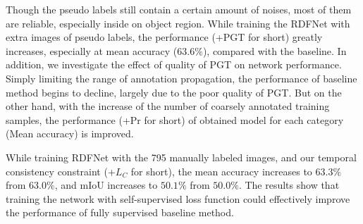 Though the pseudo labels still contain a certain amount of noises, most of them are reliable, especially inside on object region. 
%
While training the RDFNet with extra images of pseudo labels, the performance (+PGT for short) greatly increases, especially at mean accuracy ($63.6\%$), compared with the baseline.
%
In addition, we investigate the effect of quality of PGT on network performance.
%
Simply limiting the range of annotation propagation, the performance of baseline method begins to decline, largely due to the poor quality of PGT.
%
But on the other hand, with the increase of the number of coarsely annotated training samples, the performance (+Pr for short) of obtained model for each category (Mean accuracy) is improved.

 While training RDFNet with the 795 manually labeled images, and our temporal consistency constraint (+$L_C$ for short), the mean accuracy increases to $63.3\%$ from $63.0\%$, and mIoU increases to $50.1\%$ from $50.0\%$. 
%
The results show that training the network with self-supervised loss function could effectively improve the performance of fully supervised baseline method.


